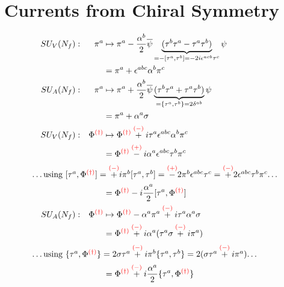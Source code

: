 \section{Currents from Chiral Symmetry}
\label{sec:Apdx_CurrentsChirSym}

\begin{subequations}
    \begin{align}
        &&SU_V(N_f):&&\pi^a&\mapsto\pi^a-\frac{\alpha^b}{2}\overline{\psi}\underbrace{(\tau^b\tau^a-\tau^a\tau^b)}_{=-[\tau^a,\tau^b]=-2{i}\epsilon^{acb}\tau^c}\psi&&&&\\
        &&&&&=\pi^a+\epsilon^{abc}\alpha^b\pi^c&&&&\\
        &&SU_A(N_f):&&\pi^a&\mapsto\pi^a+\frac{\alpha^b}{2}\overline{\psi}\underbrace{(\tau^b\tau^a+\tau^a\tau^b)}_{=\{\tau^a,\tau^b\}=2\delta^{ab}}\psi&&&&\\
        &&&&&=\pi^a+\alpha^a\sigma&&&&\\
        &&SU_V(N_f):&&\Phi^{\textcolor{red}{(\dagger)}}&\mapsto\Phi^{\textcolor{red}{(\dagger)}}\overset{\textcolor{red}{(-)}}{+}{i}\tau^a\epsilon^{abc}\alpha^b\pi^c&&&&\\
        &&&&&=\Phi^{\textcolor{red}{(\dagger)}}\overset{\textcolor{red}{(+)}}{-}{i}\alpha^a\epsilon^{abc}\tau^b\pi^c&&&&\\
        \intertext{\dots using $[\tau^a,\Phi^{\textcolor{red}{(\dagger)}}]=\overset{\textcolor{red}{(-)}}{+}{i}\pi^b[\tau^a,\tau^b]=\overset{\textcolor{red}{(+)}}{-}2\pi^b\epsilon^{abc}\tau^c=\overset{\textcolor{red}{(-)}}{+}2\epsilon^{abc}\tau^b\pi^c$\dots}
        &&&&&=\Phi^{\textcolor{red}{(\dagger)}}-{i}\frac{\alpha^a}{2}[\tau^a,\Phi^{\textcolor{red}{(\dagger)}}]&&&&\\
        &&SU_A(N_f):&&\Phi^{\textcolor{red}{(\dagger)}}&\mapsto\Phi^{\textcolor{red}{(\dagger)}}-\alpha^a\pi^a\overset{\textcolor{red}{(-)}}{+}{i}\tau^a\alpha^a\sigma&&&&\\
        &&&&&=\Phi^{\textcolor{red}{(\dagger)}}\overset{\textcolor{red}{(-)}}{+}{i}\alpha^a(\tau^a\sigma\overset{\textcolor{red}{(-)}}{+}{i}\pi^a)&&&&\\
        \intertext{\dots using $\{\tau^a,\Phi^{\textcolor{red}{(\dagger)}}\}=2\sigma\tau^a\overset{\textcolor{red}{(-)}}{+}{i}\pi^b\{\tau^a,\tau^b\}=2(\sigma\tau^a\overset{\textcolor{red}{(-)}}{+}{i}\pi^a)$\dots}
        &&&&&=\Phi^{\textcolor{red}{(\dagger)}}\overset{\textcolor{red}{(-)}}{+}{i}\frac{\alpha^a}{2}\{\tau^a,\Phi^{\textcolor{red}{(\dagger)}}\}&&&&
    \end{align}
\end{subequations}

